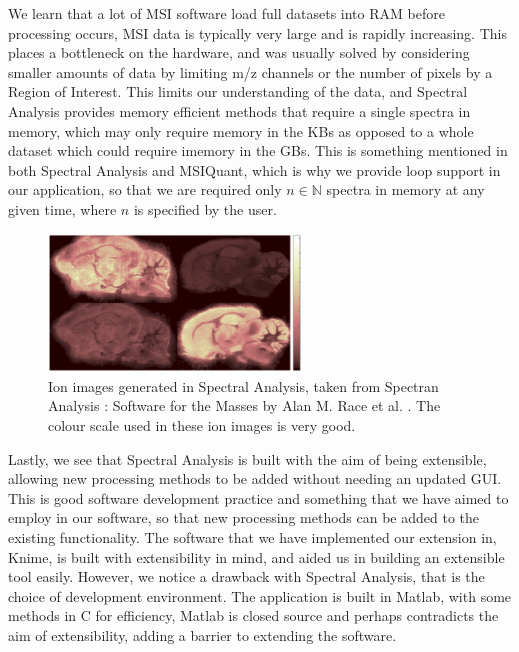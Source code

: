 \documentclass[11pt,openany]{book}
\begin{document}
We learn that a lot of MSI software load full datasets into RAM before processing occurs, MSI data is typically very large and is rapidly increasing. This places a bottleneck on the hardware, and was usually solved by considering smaller amounts of data by limiting m/z channels or the number of pixels by a Region of Interest. This limits our understanding of the data, and Spectral Analysis provides memory efficient methods that require a single spectra in memory, which may only require memory in the KBs as opposed to a whole dataset which could require imemory in the GBs. This is something mentioned in both Spectral Analysis and MSIQuant, which is why we provide loop support in our application, so that we are required only $n\in \mathbb{N}$ spectra in memory at any given time, where $n$ is specified by the user. 

\begin{figure}
    \centering
    \includegraphics[width=0.6\textwidth]{./images/spectral_analysis_ion_images.png}
    \caption{Ion images generated in Spectral Analysis, taken from Spectran Analysis : Software for the Masses by Alan M. Race et al. \cite{spectral_analysis_article}. The colour scale used in these ion images is very good.}
    \label{fig:spectral_analysis_ion_images}
\end{figure}

Lastly, we see that Spectral Analysis is built with the aim of being extensible, allowing new processing methods to be added without needing an updated GUI. This is good software development practice and something that we have aimed to employ in our software, so that new processing methods can be added to the existing functionality. The software that we have implemented our extension in, Knime, is built with extensibility in mind, and aided us in building an extensible tool easily. However, we notice a drawback with Spectral Analysis, that is the choice of development environment. The application is built in Matlab, with some methods in C for efficiency, Matlab is closed source and perhaps contradicts the aim of extensibility, adding a barrier to extending the software. 
 
\end{document}
